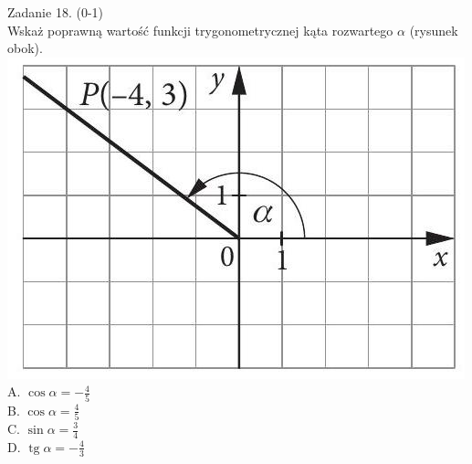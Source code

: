 \documentclass[10pt]{article}
\begin{document}
Zadanie 18. (0-1)\\
Wskaż poprawną wartość funkcji trygonometrycznej kąta rozwartego \(\alpha\) (rysunek obok).\\
\includegraphics[max width=\textwidth, center]{2024_11_21_4a1915d79134dda0750eg-08(1)}\\
A. \(\cos \alpha=-\frac{4}{5}\)\\
B. \(\cos \alpha=\frac{4}{5}\)\\
C. \(\sin \alpha=\frac{3}{4}\)\\
D. \(\operatorname{tg} \alpha=-\frac{4}{3}\)
\end{document}

